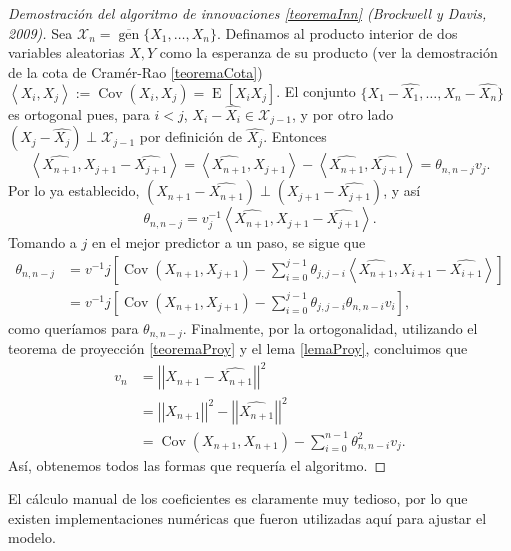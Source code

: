 \documentclass[11pt,letterpaper]{article}
\newcommand{\norm}[1]{\ensuremath{\left|\left|#1\right|\right|}}
\newcommand{\dotproduct}[2]{\ensuremath{\left\langle#1,#2\right\rangle}}
\newcommand{\expected}{\ensuremath{\operatorname{E}}}
\newcommand{\covariance}{\ensuremath{\operatorname{Cov}}}
\theoremstyle{definition}
\theoremstyle{theorem}
\theoremstyle{remark}
\begin{document}
	\begin{proof}[Demostración del algoritmo de innovaciones \ref{teoremaInn} (Brockwell y Davis, 2009){\rm\cite{brockwell2009time}}]
		Sea \(\mathcal{X}_n=\overline{\operatorname{gen}}\{X_1,\dots,X_n\}\). Definamos al producto interior de dos variables aleatorias \(X,Y\) como la esperanza de su producto (ver la demostración de la cota de Cramér-Rao \ref{teoremaCota}) \(\dotproduct{X_i}{X_j}:=\covariance(X_i,X_j)=\expected[X_iX_j]\). El conjunto \(\{X_1-\hat{X_1},\dots,X_n-\hat{X_n}\}\) es ortogonal pues, para \(i<j\), \(X_i-\hat{X_i}\in\mathcal{X}_{j-1}\), y por otro lado \((X_j-\hat{X_j})\perp\mathcal{X}_{j-1}\) por definición de \(\hat{X_j}\). Entonces
		\[\dotproduct{\hat{X_{n+1}}}{X_{j+1}-\hat{X_{j+1}}}=\dotproduct{\hat{X_{n+1}}}{X_{j+1}}-\dotproduct{\hat{X_{n+1}}}{\hat{X_{j+1}}}=\theta_{n,n-j}v_j.\]
		Por lo ya establecido, \((X_{n+1}-\hat{X_{n+1}})\perp(X_{j+1}-\hat{X_{j+1}})\), y así
		\[\theta_{n,n-j}=v^{-1}_j\dotproduct{\hat{X_{n+1}}}{X_{j+1}-\hat{X_{j+1}}}.\]
		Tomando a \(j\) en el mejor predictor a un paso, se sigue que
		\begin{align*}
			\theta_{n,n-j}&=v^{-1}j\left[\covariance(X_{n+1},X_{j+1})-\sum_{i=0}^{j-1}\theta_{j,j-i}\dotproduct{\hat{X_{n+1}}}{X_{i+1}-\hat{X_{i+1}}}\right] \\
			&=v^{-1}j\left[\covariance(X_{n+1},X_{j+1})-\sum_{i=0}^{j-1}\theta_{j,j-i}\theta_{n,n-i}v_i\right],
		\end{align*}
		como queríamos para \(\theta_{n,n-j}\). Finalmente, por la ortogonalidad, utilizando el teorema de proyección \ref{teoremaProy} y el lema \ref{lemaProy}, concluimos que
		\begin{align*}
			v_n&=\norm{X_{n+1}-\hat{X_{n+1}}}^2 \\
			&=\norm{X_{n+1}}^2-\norm{\hat{X_{n+1}}}^2 \\
			&=\covariance(X_{n+1},X_{n+1})-\sum_{i=0}^{n-1}\theta^2_{n,n-i}v_j.
		\end{align*}
		Así, obtenemos todos las formas que requería el algoritmo.
	\end{proof}
	El cálculo manual de los coeficientes es claramente muy tedioso, por lo que existen implementaciones numéricas que fueron utilizadas aquí para ajustar el modelo.
\end{document}
